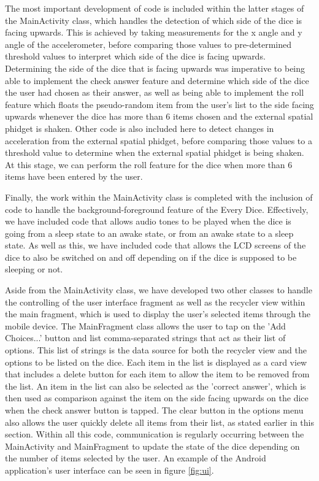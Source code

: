 \documentclass{sigchi}
\begin{document}
The most important development of code is included within the latter stages of the MainActivity class, which handles the detection of which side of the dice is facing upwards. This is achieved by taking measurements for the x angle and y angle of the accelerometer, before comparing those values to pre-determined threshold values to interpret which side of the dice is facing upwards. Determining the side of the dice that is facing upwards was imperative to being able to implement the check answer feature and determine which side of the dice the user had chosen as their answer, as well as being able to implement the roll feature which floats the pseudo-random item from the user's list to the side facing upwards whenever the dice has more than 6 items chosen and the external spatial phidget is shaken. Other code is also included here to detect changes in acceleration from the external spatial phidget, before comparing those values to a threshold value to determine when the external spatial phidget is being shaken. At this stage, we can perform the roll feature for the dice when more than 6 items have been entered by the user. 

Finally, the work within the MainActivity class is completed with the inclusion of code to handle the background-foreground feature of the Every Dice. Effectively, we have included code that allows audio tones to be played when the dice is going from a sleep state to an awake state, or from an awake state to a sleep state. As well as this, we have included code that allows the LCD screens of the dice to also be switched on and off depending on if the dice is supposed to be sleeping or not.

Aside from the MainActivity class, we have developed two other classes to handle the controlling of the user interface fragment as well as the recycler view within the main fragment, which is used to display the user's selected items through the mobile device. The MainFragment class allows the user to tap on the 'Add Choices...' button and list comma-separated strings that act as their list of options. This list of strings is the data source for both the recycler view and the options to be listed on the dice. Each item in the list is displayed as a card view that includes a delete button for each item to allow the item to be removed from the list. An item in the list can also be selected as the 'correct answer', which is then used as comparison against the item on the side facing upwards on the dice when the check answer button is tapped. The clear button in the options menu also allows the user quickly delete all items from their list, as stated earlier in this section. Within all this code, communication is regularly occurring between the MainActivity and MainFragment to update the state of the dice depending on the number of items selected by the user. An example of the Android application's user interface can be seen in figure \ref{fig:ui}.
\end{document}
